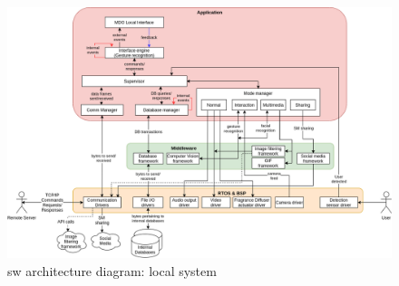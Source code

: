 %
\begin{figure}[htb!]
\centering
    \includegraphics[width=1.0\columnwidth]{./img/sw-arch-local.png}
  \caption{\gls{sw} architecture diagram: local system}%
\label{fig:sw-arch-local}
\end{figure}
%
%
